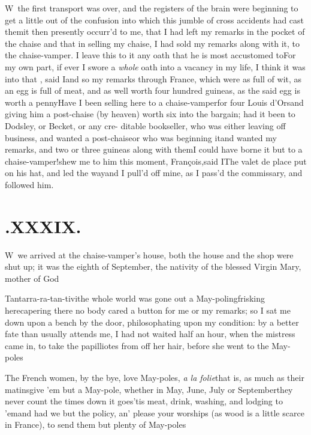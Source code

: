 \documentclass{article}
\begin{document}
\lettrine{W}{\,} the first transport was over,
and the registers of the brain were beginning to get a little out
of the confusion into which this jumble of cross accidents had cast
them\tsk it then presently occurr’d to me, that I had left
my remarks in the pocket of the chaise\break
\tsk and that in selling my
chaise, I had sold my remarks along with it, to the chaise-vamper.
\hskip 78pt  I leave this \break to it any oath that he is most accustomed
to\tsh For my own part, if ever I swore a \textit{whole}
oath into a vacancy in my life, I think it was into
that\tsh {}  , said I\tsk and so my
remarks through France, which were as full of wit, as an egg
is full of meat, and as well worth four hundred guineas, as the
said egg is worth a penny\tsk Have I been selling here to a
chaise-vamper\tsk for four Louis d’Ors\tsk and
giving him a post-chaise (by heaven) worth six into the bargain;
had it been to Dodsley, or Becket, or any
cre- ditable bookseller, who was either leaving off business, and
wanted a post-chaise\tsk or who was beginning it\tsk and wanted
my remarks, and two or three guineas along with them\tsk I could
have borne it
\tsh but to a chaise-vamper!\tsk shew me to
him this moment, François,\tsk said I\tsk The
valet de place put on his hat, and led the way\tsk and I
pull’d off mine, as I pass’d the commissary, and
followed him.

\vfill{}\eject
\section{.\enspace XXXIX.}

\lettrine{W}{\,} we arrived at the
chaise-vamper’s house, both the house and the shop were shut
up; it was the eighth of September, the nativity of the
blessed Virgin Mary, mother of God\tsh

\tsh Tantarra-ra-tan-tivi\tsh the whole world was gone out a
May-poling\break\tsk frisking here\tsk capering there\tsk
no\break
body cared a button for me or my remarks; so I sat me down upon
a bench by the door, philosophating upon my condition: by a
better fate than usually attends me, I had not waited half an
hour, when the mistress came in, to take the papilliotes from
off her hair, before she went to the May-poles\tsh

The French women, by the bye, love May-poles, \textit{a
la folie}\tsk that is, as much as
their matins\tsh give ’em but a May-pole, whether in May, June,
July or September\tsk they never count the times\break
\tsh down it
goes\tsh ’tis meat, drink, washing, and lodging to ’em\tsh and
had we but the policy, an’ please your worships (as wood is a
little scarce in France), to send them but plenty of
May-\break poles\tsh
\end{document}
